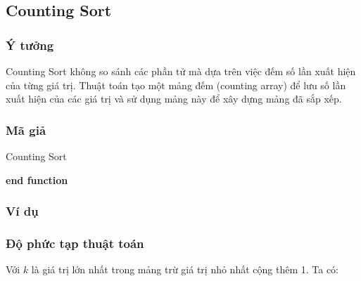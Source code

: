 \subsection{Counting Sort}

\subsubsection{Ý tưởng}

Counting Sort không so sánh các phần tử mà dựa trên việc đếm số lần xuất hiện của từng giá trị. Thuật toán tạo một mảng đếm (counting array) để lưu số lần xuất hiện của các giá trị và sử dụng mảng này để xây dựng mảng đã sắp xếp. 

\subsubsection{Mã giả}

\begin{algorithm}[H]
	\caption{Counting Sort}
	\label{counting-sort}
	
	\textbf{end function}
\end{algorithm}

\subsubsection{Ví dụ}

\subsubsection{Độ phức tạp thuật toán}

Với $k$ là giá trị lớn nhất trong mảng trừ giá trị nhỏ nhất cộng thêm 1. Ta có:

